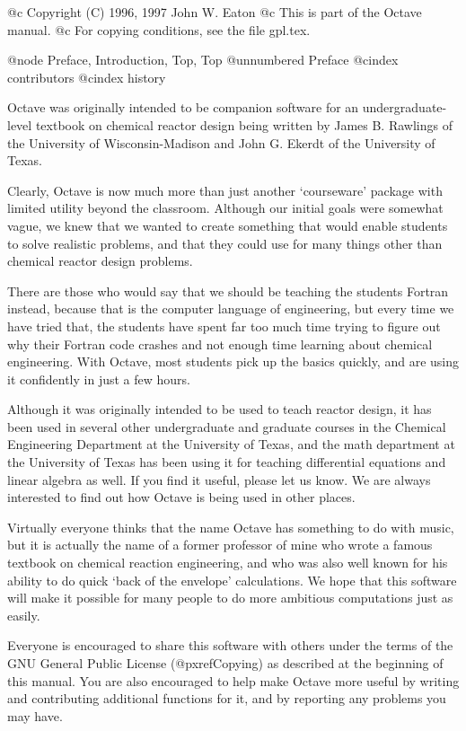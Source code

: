 @c Copyright (C) 1996, 1997 John W. Eaton
@c This is part of the Octave manual.
@c For copying conditions, see the file gpl.tex.

@node Preface, Introduction, Top, Top
@unnumbered Preface
@cindex contributors
@cindex history

Octave was originally intended to be companion software for an
undergraduate-level textbook on chemical reactor design being written by
James B. Rawlings of the University of Wisconsin-Madison and John
G. Ekerdt of the University of Texas.

Clearly, Octave is now much more than just another `courseware' package
with limited utility beyond the classroom.  Although our initial goals
were somewhat vague, we knew that we wanted to create something that
would enable students to solve realistic problems, and that they could
use for many things other than chemical reactor design problems.

There are those who would say that we should be teaching the students
Fortran instead, because that is the computer language of engineering,
but every time we have tried that, the students have spent far too much
time trying to figure out why their Fortran code crashes and not enough
time learning about chemical engineering.  With Octave, most students
pick up the basics quickly, and are using it confidently in just a few
hours.

Although it was originally intended to be used to teach reactor design,
it has been used in several other undergraduate and graduate
courses in the Chemical Engineering Department at the University of
Texas, and the math department at the University of Texas has been using
it for teaching differential equations and linear algebra as well.  If
you find it useful, please let us know.  We are always interested to
find out how Octave is being used in other places.

Virtually everyone thinks that the name Octave has something to do with
music, but it is actually the name of a former professor of mine who
wrote a famous textbook on chemical reaction engineering, and who was
also well known for his ability to do quick `back of the envelope'
calculations.  We hope that this software will make it possible for many
people to do more ambitious computations just as easily.

Everyone is encouraged to share this software with others under the
terms of the GNU General Public License (@pxref{Copying}) as described
at the beginning of this manual.  You are also encouraged to help make
Octave more useful by writing and contributing additional functions for
it, and by reporting any problems you may have.

